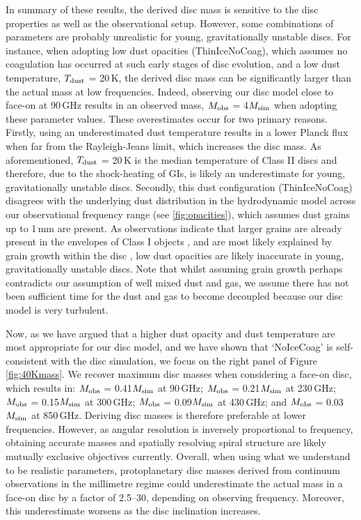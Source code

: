 \documentclass[fleqn,usenatbib]{mnras}
\begin{document}
In summary of these results, the derived disc mass is sensitive to the disc properties as well as the observational setup. However, some combinations of parameters are probably unrealistic for young, gravitationally unstable discs. For instance, when adopting low dust opacities (ThinIceNoCoag), which assumes no coagulation has occurred at such early stages of disc evolution, and a low dust temperature, $T_ {\rm dust}$ = 20\,K, the derived disc mass can be significantly larger than the actual mass at low frequencies. Indeed, observing our disc model close to face-on at 90\,GHz results in an observed mass, $M_{\rm obs}$ = 4$M_{\rm sim}$ when adopting these parameter values. These overestimates occur for two primary reasons. Firstly, using an underestimated dust temperature results in a lower Planck flux when far from the Rayleigh-Jeans limit, which increases the disc mass. As aforementioned, $T_ {\rm dust}$ = 20\,K is the median temperature of Class II discs and therefore, due to the shock-heating of GIs, is likely an underestimate for young, gravitationally unstable discs. Secondly, this dust configuration (ThinIceNoCoag) disagrees with the underlying dust distribution in the hydrodynamic model across our observational frequency range (see \autoref{fig:opacities}), which assumes dust grains up to 1\,mm are present. As observations indicate that larger grains are already present in the envelopes of Class I objects \citep[e.g.][]{Miotello&Testi2014}, and are most likely explained by grain growth within the disc \citep{Wong&Hirashita2016}, low dust opacities are likely inaccurate in young, gravitationally unstable discs. Note that whilst assuming grain growth perhaps contradicts our assumption of well mixed dust and gas, we assume there has not been sufficient time for the dust and gas to become decoupled because our disc model is very turbulent.

\smallskip

Now, as we have argued that a higher dust opacity and dust temperature are most appropriate for our disc model, and we have shown that `NoIceCoag' is self-consistent with the disc simulation, we focus on the right panel of Figure \ref{fig:40Kmass}. We recover maximum disc masses when considering a face-on disc, which results in: $M_{\rm obs}$ = 0.41$M_ {\rm sim}$ at 90\,GHz; $M_{\rm obs}$ = 0.21$M_ {\rm sim}$ at 230\,GHz; $M_ {\rm obs}$ = 0.15$M_ {\rm sim}$ at 300\,GHz; $M_ {\rm obs}$ = 0.09$M_ {\rm sim}$ at 430\,GHz; and $M_ {\rm obs}$ = 0.03$M_ {\rm sim}$ at 850\,GHz. Deriving disc masses is therefore preferable at lower frequencies. However, as angular resolution is inversely proportional to frequency, obtaining accurate masses and spatially resolving spiral structure are likely mutually exclusive objectives currently. Overall, when using what we understand to be realistic parameters, protoplanetary disc masses derived from continuum observations in the millimetre regime could underestimate the actual mass in a face-on disc by a factor of 2.5--30, depending on observing frequency. Moreover, this underestimate worsens as the disc inclination increases.
\end{document}
